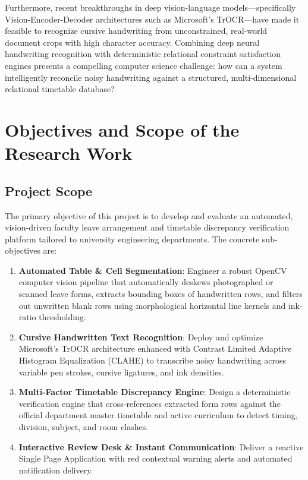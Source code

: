 \documentclass[12pt,letterpaper]{report}
\begin{document}
Furthermore, recent breakthroughs in deep vision-language models---specifically Vision-Encoder-Decoder architectures such as Microsoft's TrOCR---have made it feasible to recognize cursive handwriting from unconstrained, real-world document crops with high character accuracy. Combining deep neural handwriting recognition with deterministic relational constraint satisfaction engines presents a compelling computer science challenge: how can a system intelligently reconcile noisy handwriting against a structured, multi-dimensional relational timetable database?

\section{Objectives and Scope of the Research Work}
\subsection{Project Scope}
The primary objective of this project is to develop and evaluate an automated, vision-driven faculty leave arrangement and timetable discrepancy verification platform tailored to university engineering departments.
The concrete sub-objectives are:
\begin{enumerate}
    \item \textbf{Automated Table \& Cell Segmentation}: Engineer a robust OpenCV computer vision pipeline that automatically deskews photographed or scanned leave forms, extracts bounding boxes of handwritten rows, and filters out unwritten blank rows using morphological horizontal line kernels and ink-ratio thresholding.
    \item \textbf{Cursive Handwritten Text Recognition}: Deploy and optimize Microsoft's TrOCR architecture enhanced with Contrast Limited Adaptive Histogram Equalization (CLAHE) to transcribe noisy handwriting across variable pen strokes, cursive ligatures, and ink densities.
    \item \textbf{Multi-Factor Timetable Discrepancy Engine}: Design a deterministic verification engine that cross-references extracted form rows against the official department master timetable and active curriculum to detect timing, division, subject, and room clashes.
    \item \textbf{Interactive Review Desk \& Instant Communication}: Deliver a reactive Single Page Application with red contextual warning alerts and automated notification delivery.
\end{enumerate}
\end{document}
